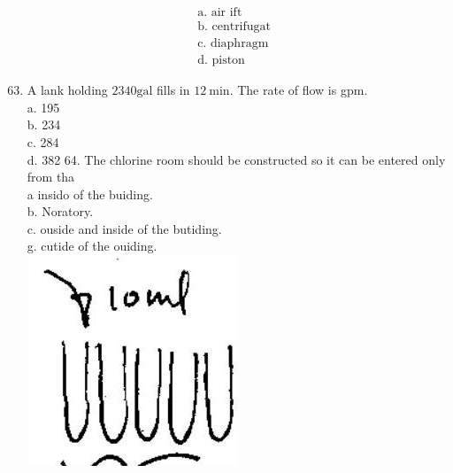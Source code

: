 \documentclass[10pt]{article}
\begin{document}
$$
\begin{aligned}
&\text { a. air ift } \\
&\text { b. centrifugat } \\
&\text { c. diaphragm } \\
&\text { d. piston }
\end{aligned}
$$

\begin{enumerate}
  \setcounter{enumi}{62}
  \item A lank holding $2340 \mathrm{gal}$ fills in $12 \mathrm{~min}$. The rate of flow is gpm.\\
a. 195\\
b. 234\\
c. 284\\
d. 382 64. The chlorine room should be constructed so it can be entered only from tha\\
a insido of the buiding.\\
b. Noratory.\\
c. ouside and inside of the butiding.\\
g. cutide of the ouiding.\\

\includegraphics[max width=\textwidth]{2022_11_11_ca6a6c1a0324ee23e523g-11}
\end{enumerate}
\end{document}
